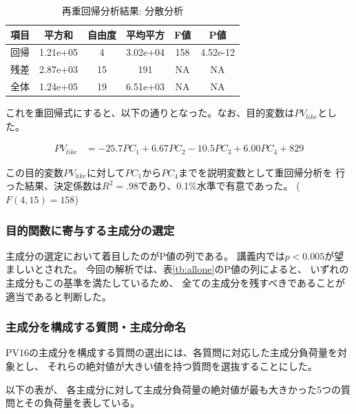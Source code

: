 \documentclass[11pt,a4paper, uplatex]{jsarticle}
\begin{document}
\begin{table}[htbp]
  \begin{center}
    \caption{再重回帰分析結果: 分散分析}
    \begin{tabular}{c|c|c|c|c|c}
      \hline
      項目 & 平方和 & 自由度 & 平均平方 & F値 & P値 \\ \hline \hline
      回帰 & 1.21e+05 & 4 & 3.02e+04 & 158 & 4.52e-12 \\
      残差 & 2.87e+03 & 15 & 191 & NA & NA \\
      全体 & 1.24e+05 & 19 & 6.51e+03 & NA & NA \\
    \end{tabular}
    \label{annova}
  \end{center}
\end{table}

これを重回帰式にすると、以下の通りとなった。なお、目的変数は$ PV_{like} $とした。

\begin{equation}
  \begin{split}
    PV_{like} &= -25.7PC_1 + 6.67PC_2 - 10.5PC_3 + 6.00PC_4 + 829
  \end{split}
\end{equation}

この目的変数$ PV_{like} $に対して$ PC_1 $から$ PC_4 $までを説明変数として重回帰分析を
行った結果、決定係数は$ R^2 = .98 $であり、0.1\%水準で有意であった。
($ F(4, 15) = 158 $)

\subsubsection{目的関数に寄与する主成分の選定}
\label{sc:pval}

主成分の選定において着目したのがP値の列である。
講義内では$ p < 0.005 $が望ましいとされた。
今回の解析では、表\ref{tb:allone}のP値の列によると、
いずれの主成分もこの基準を満たしているため、
全ての主成分を残すべきであることが適当であると判断した。

\subsubsection{主成分を構成する質問・主成分命名}
\label{sc:allfaclor}
PV16の主成分を構成する質問の選出には、各質問に対応した主成分負荷量を対象とし、
それらの絶対値が大きい値を持つ質問を選抜することにした。

以下の表\label{tb:allpcs}が、
各主成分に対して主成分負荷量の絶対値が最も大きかった5つの質問とその負荷量を表している。
\end{document}
